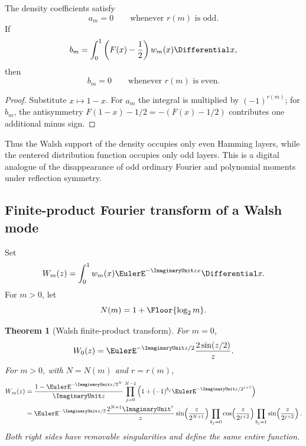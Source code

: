 \documentclass[11pt]{article}
\newtheorem{theorem}{Theorem}[section]
\theoremstyle{definition}
\theoremstyle{remark}
\begin{document}
\begin{proposition}
\label{p3:prop:Walsh-selection}
The density coefficients satisfy
\begin{equation}\label{p3:eq:a-odd-vanish}
 a_m=0\qquad\text{whenever }r(m)\text{ is odd}.
\end{equation}
If
\begin{equation}\label{p3:eq:b_m-F}
 b_m=\int_0^1\left(F(x)-\frac12\right)w_m(x)\Differential x,
\end{equation}
then
\begin{equation}\label{p3:eq:b-even-vanish}
 b_m=0\qquad\text{whenever }r(m)\text{ is even}.
\end{equation}
\end{proposition}

\begin{proof}
Substitute $x\mapsto1-x$.  For $a_m$ the integral is multiplied by
$(-1)^{r(m)}$; for $b_m$, the antisymmetry
$F(1-x)-1/2=-(F(x)-1/2)$ contributes one additional minus sign.
\end{proof}

Thus the Walsh support of the density occupies only even Hamming layers, while
the centered distribution function occupies only odd layers.  This is a
digital analogue of the disappearance of odd ordinary Fourier and polynomial
moments under reflection symmetry.

\subsection{Finite-product Fourier transform of a Walsh mode}

Set
\begin{equation}\label{p3:eq:Wm-def}
 W_m(z)=\int_0^1w_m(x)\EulerE^{-\ImaginaryUnit zx}\Differential x.
\end{equation}
For $m>0$, let
\begin{equation}\label{p3:eq:Nm-def}
 N(m)=1+\Floor{\log_2m}.
\end{equation}

\begin{theorem}[Walsh finite-product transform]
\label{p3:thm:Walsh-product-transform}
For $m=0$,
\begin{equation}\label{p3:eq:W0}
 W_0(z)=\EulerE^{-\ImaginaryUnit z/2}\frac{2\sin(z/2)}{z}.
\end{equation}
For $m>0$, with $N=N(m)$ and $r=r(m)$,
\begin{align}
 W_m(z)
 &=\frac{1-\EulerE^{-\ImaginaryUnit z/2^N}}{\ImaginaryUnit z}
   \prod_{j=0}^{N-1}
   \left(1+(-1)^{b_j}\EulerE^{-\ImaginaryUnit z/2^{j+1}}\right)
 \label{p3:eq:Wm-exponential-product}\\
 &=\EulerE^{-\ImaginaryUnit z/2}\frac{2^{N+1}\ImaginaryUnit^r}{z}
   \sin\!\left(\frac{z}{2^{N+1}}\right)
   \prod_{b_j=0}\cos\!\left(\frac{z}{2^{j+2}}\right)
   \prod_{b_j=1}\sin\!\left(\frac{z}{2^{j+2}}\right).
 \label{p3:eq:Wm-trig-product}
\end{align}
Both right sides have removable singularities and define the same entire
function.
\end{theorem}
\end{document}
